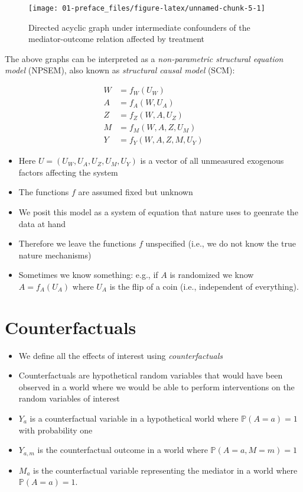 \documentclass[
  12pt,
]{book}
\providecommand{\tightlist}{%
  \setlength{\itemsep}{0pt}\setlength{\parskip}{0pt}}
\theoremstyle{definition}
\theoremstyle{definition}
\theoremstyle{definition}
\renewcommand{\P}{\mathbb{P}}
\newcommand{\1}{\mathbbm{1}}
\begin{document}
\begin{figure}

{\centering \texttt{[image: 01-preface\_files/figure-latex/unnamed-chunk-5-1]} 

}

\caption{Directed acyclic graph under intermediate confounders of the mediator-outcome relation affected by treatment}\label{fig:unnamed-chunk-5}
\end{figure}

The above graphs can be interpreted as a \emph{non-parametric structural equation model}
(NPSEM), also known as \emph{structural causal model} (SCM):

\begin{align}
  W & = f_W(U_W)\\
  A & = f_A(W, U_A)\\
  Z & = f_Z(W, A, U_Z)\\
  M & = f_M(W, A, Z, U_M)\\
  Y & = f_Y(W, A, Z, M, U_Y)
\end{align}

\begin{itemize}
\tightlist
\item
  Here \(U=(U_W, U_A, U_Z, U_M, U_Y)\) is a vector of all unmeasured exogenous
  factors affecting the system
\item
  The functions \(f\) are assumed fixed but unknown
\item
  We posit this model as a system of equation that nature uses to geenrate the
  data at hand
\item
  Therefore we leave the functions \(f\) unspecified (i.e., we do not know the
  true nature mechanisms)
\item
  Sometimes we know something: e.g., if \(A\) is randomized we know \(A=f_A(U_A)\)
  where \(U_A\) is the flip of a coin (i.e., independent of everything).
\end{itemize}

\hypertarget{counterfactuals}{%
\section{Counterfactuals}\label{counterfactuals}}

\begin{itemize}
\tightlist
\item
  We define all the effects of interest using \emph{counterfactuals}
\item
  Counterfactuals are hypothetical random variables that would have been
  observed in a world where we would be able to perform interventions on the
  random variables of interest
\item
  \(Y_a\) is a counterfactual variable in a hypothetical world where \(\P(A=a)=1\)
  with probability one
\item
  \(Y_{a,m}\) is the counterfactual outcome in a world where \(\P(A=a,M=m)=1\)
\item
  \(M_a\) is the counterfactual variable representing the mediator in a world
  where \(\P(A=a)=1\).
\end{itemize}
\end{document}
